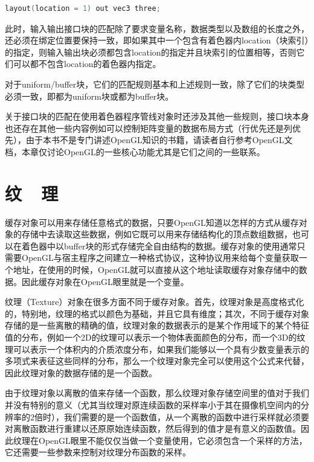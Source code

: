 \begin{lstlisting}[language=C++]
layout(location = 1) out vec3 three;
\end{lstlisting}

此时，输入输出接口块的匹配除了要求变量名称，数据类型以及数组的长度之外，还必须在绑定位置要保持一致，即如果其中一个包含有着色器内location（块索引）的指定，则输入输出块必须都包含location的指定并且块索引的位置相等，否则它们可以都不包含location的着色器内指定。

对于uniform/buffer块，它们的匹配规则基本和上述规则一致，除了它们的块类型必须一致，即都为uniform块或都为buffer块。

关于接口块的匹配在使用着色器程序管线对象时还涉及其他一些规则，接口块本身也还存在其他一些内容例如可以控制矩阵变量的数据布局方式（行优先还是列优先），由于本书不是专门讲述OpenGL知识的书籍，请读者自行参考OpenGL文档，本章仅讨论OpenGL的一些核心功能尤其是它们之间的一些联系。





\section{纹~~理}\label{sec:api-textures}
缓存对象可以用来存储任意格式的数据，只要OpenGL知道以怎样的方式从缓存对象的存储中去读取这些数据，例如它既可以用来存储结构化的顶点数组数据，也可以在着色器中以buffer块的形式存储完全自由结构的数据。缓存对象的使用通常只需要OpenGL与宿主程序之间建立一种格式协议，这种协议用来给每个变量获取一个地址，在使用的时候，OpenGL就可以直接从这个地址读取缓存对象存储中的数据。因此缓存对象在OpenGL眼里就是一个变量。

纹理（Texture）对象在很多方面不同于缓存对象。首先，纹理对象是高度格式化的，特别地，纹理的格式以颜色为基础，并且它具有维度；其次，不同于缓存对象存储的是一些离散的精确的值，纹理对象的数据表示的是某个作用域下的某个特征值的分布，例如一个2D的纹理可以表示一个物体表面颜色的分布，而一个3D的纹理可以表示一个体积内的介质浓度分布，如果我们能够以一个具有少数变量表示的多项式来表征这些同样的分布，那么一个纹理对象完全可以使用这个公式来代替，因此纹理对象的数据存储的是一个函数。

由于纹理对象以离散的值来存储一个函数，那么纹理对象存储空间里的值对于我们并没有特别的意义（尤其当纹理对原连续函数的采样率小于其在摄像机空间内的分辨率的2倍时），我们需要的是一个函数值，从一个离散的函数中进行采样就必须要对离散函数进行重建以还原原始连续函数，然后得到的值才是有意义的函数值。因此纹理在OpenGL眼里不能仅仅当做一个变量使用，它必须包含一个采样的方法，它还需要一些参数来控制对纹理分布函数的采样。

